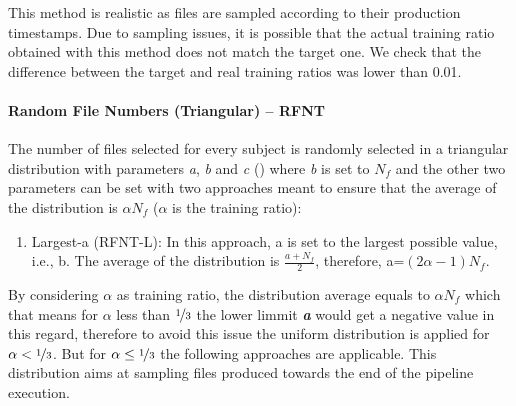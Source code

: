 \documentclass[10pt, conference, compsocconf]{IEEEtran}
\newcommand{\todo}[1]{\marginpar{\parbox{18mm}{\flushleft\tiny\color{red}\textbf{TODO}:
      #1}}}
\begin{document}
This method is realistic as files are sampled according to their production timestamps.
Due to sampling issues, it is possible that the actual training ratio obtained with this method
does not match the target one. We check that the difference between the target and real training ratios
was lower than 0.01.\\ 

\paragraph{Random File Numbers (Triangular) -- RFNT}
The number of files selected for every subject is randomly selected in
a triangular distribution with parameters \textit{a}, \textit{b} and 
\textit{c} (\todo{see Figure X}) where \textit{b} is set to $N_{f}$ and the other two 
parameters can be set with two approaches meant to ensure that the 
average of the distribution is $\alpha N_{f}$ ($\alpha$ is the training 
ratio):
\begin{enumerate}
        \item Largest-a (RFNT-L): In this approach, a is set to the 
        largest possible value, i.e., b. The average of the 
        distribution is $\frac{a+N_{f}}{2}$, therefore, 
        a=$(2\alpha-1)N_{f}$.
\end{enumerate}

By considering $\alpha$ 
as training ratio, the distribution average equals to $\alpha N_{f}$ which that means 
for $\alpha$ less than $\nicefrac{1}{3}$ the lower limmit \textit{\textbf{a}} would 
get a negative value in this regard, therefore to avoid this issue the uniform distribution 
is applied for $\alpha < \nicefrac{1}{3}$. But for $\alpha \leq \nicefrac{1}{3}$ the following 
approaches are applicable. This distribution aims at sampling files produced towards 
the end of the pipeline execution.
\end{document}
